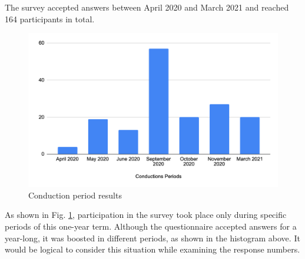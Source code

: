 The survey accepted answers between April 2020 and March 2021 and reached 164 participants in total.
\begin{figure}[ht!]
    \centering
    \includegraphics[scale=0.3]{figures/conduction_period.png}
    \caption{Conduction period results}
    \label{fig:conduction_period}
\end{figure}

As shown in Fig. \ref{fig:conduction_period}, participation in the survey took place only during specific periods of this one-year term. Although the questionnaire accepted answers for a year-long, it was boosted in different periods,  as shown in the histogram above. It would be logical to consider this situation while examining the response numbers.